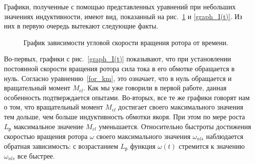 \documentclass[12pt, a4paper, openany]{extarticle}
\begin{document}
Графики, полученные с помощью представленных уравнений при небольших значениях индуктивности, имеют вид, показанный на рис.~\ref{graph_w(t)} и \ref{graph_I(t)}.
Из них в первую очередь вытекают следующие факты.

\begin{figure}[h]
	\noindent{}
	\caption{График зависимости угловой скорости вращения ротора от времени.}
	\label{graph_w(t)}
\end{figure}

Во-первых, графики с рис.~\ref{graph_I(t)} показывают, что при установлении постоянной скорости вращения ротора сила тока в его обмотке обращается в нуль.
Согласно уравнению~\eqref{for_km}, это означает, что в нуль обращается и вращательный момент $M_{el}$.
Как мы уже говорили в первой работе, данная особенность подтверждается опытами.
Во-вторых, все те же графики говорят нам о том, что вращательный момент $M_{el}$ достигает своего максимального значения тем дольше, чем больше индуктивность обмотки якоря.
При этом по мере роста $L_\textit{р}$ максимальное значение $M_{el}$ уменьшается.
Относительно быстроты достижения скоростью вращения ротора $\omega$ своего максимального значения $\omega_{nls}$ наблюдается обратная зависимость: с возрастанием $L_\textit{р}$ функция $\omega(t)$ стремится к значению $\omega_{nls}$ все быстрее.
\end{document}
